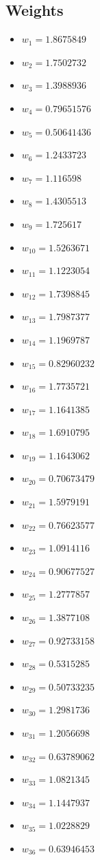 \documentclass[11pt]{article}
\begin{document}
\subsection*{Weights}
\begin{itemize}
\item $w_{1} = 1.8675849$
\item $w_{2} = 1.7502732$
\item $w_{3} = 1.3988936$
\item $w_{4} = 0.79651576$
\item $w_{5} = 0.50641436$
\item $w_{6} = 1.2433723$
\item $w_{7} = 1.116598$
\item $w_{8} = 1.4305513$
\item $w_{9} = 1.725617$
\item $w_{10} = 1.5263671$
\item $w_{11} = 1.1223054$
\item $w_{12} = 1.7398845$
\item $w_{13} = 1.7987377$
\item $w_{14} = 1.1969787$
\item $w_{15} = 0.82960232$
\item $w_{16} = 1.7735721$
\item $w_{17} = 1.1641385$
\item $w_{18} = 1.6910795$
\item $w_{19} = 1.1643062$
\item $w_{20} = 0.70673479$
\item $w_{21} = 1.5979191$
\item $w_{22} = 0.76623577$
\item $w_{23} = 1.0914116$
\item $w_{24} = 0.90677527$
\item $w_{25} = 1.2777857$
\item $w_{26} = 1.3877108$
\item $w_{27} = 0.92733158$
\item $w_{28} = 0.5315285$
\item $w_{29} = 0.50733235$
\item $w_{30} = 1.2981736$
\item $w_{31} = 1.2056698$
\item $w_{32} = 0.63789062$
\item $w_{33} = 1.0821345$
\item $w_{34} = 1.1447937$
\item $w_{35} = 1.0228829$
\item $w_{36} = 0.63946453$

\end{itemize}
\end{document}
